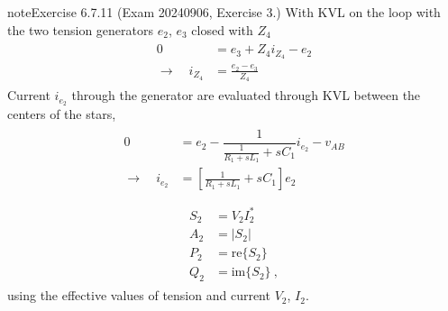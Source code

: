 \documentclass[letterpaper,10pt,english]{jupyterBook}
\begin{document}
\begin{sphinxadmonition}{note}{Exercise 6.7.11 (Exam 2024\sphinxhyphen{}09\sphinxhyphen{}06, Exercise 3.)}
\sphinxAtStartPar
{} With KVL on the loop with the two tension generators \(e_2\), \(e_3\) closed with \(Z_4\)
\begin{equation*}
\begin{split}\begin{aligned}
  0 & = e_3 + Z_4 i_{Z_4} - e_2 \\
  \rightarrow \quad i_{Z_4} & = \frac{e_2 - e_3}{Z_4}
\end{aligned}\end{split}
\end{equation*}
\sphinxAtStartPar
{} Current \(i_{e_2}\) through the generator are evaluated through KVL between the centers of the stars,
\begin{equation*}
\begin{split}\begin{aligned}
  0
  & = e_2 - \dfrac{1}{\frac{1}{R_1 + s L_1} + s C_1 } i_{e_2} - v_{AB} \\
  \rightarrow \quad i_{e_2} & = \left[ \frac{1}{R_1 + s L_1} + s C_1 \right] e_2 \\
\end{aligned}\end{split}
\end{equation*}
\sphinxAtStartPar
{}
\begin{equation*}
\begin{split}\begin{aligned}
  S_2 & = V_2 I_2^* \\
  A_2 & = |S_2| \\
  P_2 & = \text{re} \{ S_2 \} \\
  Q_2 & = \text{im} \{ S_2 \} \ ,
\end{aligned}\end{split}
\end{equation*}
\sphinxAtStartPar
using the effective values of tension and current \(V_2\), \(I_2\).
\end{sphinxadmonition}
 \label{exercise:exam-24-07-22-exe-03}
\end{document}

